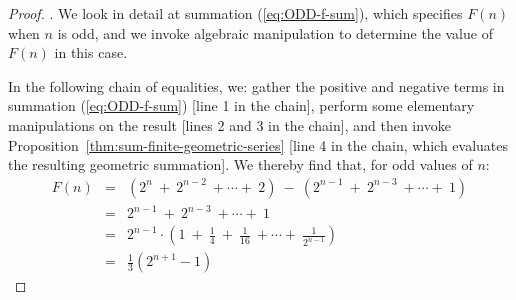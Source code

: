 \begin{proof}
\medskip

.
We look in detail at summation (\ref{eq:ODD-f-sum}), which specifies
$F(n)$ when $n$ is odd, and we invoke algebraic manipulation to
determine the value of $F(n)$ in this case.

In the following chain of equalities, we: gather the positive and
negative terms in summation (\ref{eq:ODD-f-sum}) [line 1 in the
  chain], perform some elementary manipulations on the result [lines 2
  and 3 in the chain], and then invoke
Proposition~\ref{thm:sum-finite-geometric-series} [line 4 in the
  chain, which evaluates the resulting geometric summation].  We
thereby find that, for odd values of $n$:
\begin{eqnarray*}
\label{eq:ODD-soln-f-sum}
F(n)
  & = &
\left(2^{n} \ + \ 2^{n-2} \ + \cdots + \ 2 \right) \ - \
  \left(2^{n-1} \ + \ 2^{n-3} \ + \cdots + \ 1 \right) \\
    & = &
2^{n-1} \ + \ 2^{n-3} \ + \cdots + \ 1  \\
    & = &
2^{n-1} \cdot \left( 1 \ + \ \frac{1}{4} \ + \ \frac{1}{16}  \ +
\cdots + \ \frac{1}{2^{n-1}} \right) \\
    & = &
\frac{1}{3} \left(2^{n+1} - 1 \right) 
\end{eqnarray*}

\bigskip


\end{proof}

